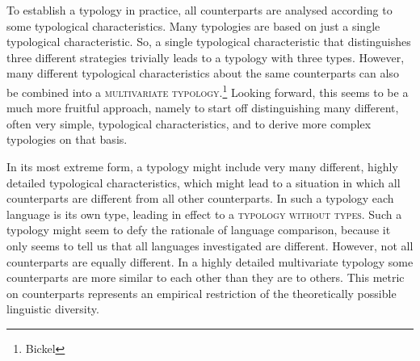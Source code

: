 %
To establish a typology in practice, all counterparts are analysed according to some  typological characteristics. Many typologies are based on just a single typological characteristic. So, a single typological characteristic that distinguishes three different strategies trivially leads to a typology with three types. However, many different typological characteristics about the same counterparts can also be combined into a \textsc{multivariate typology}.\footnote{Bickel} Looking forward, this seems to be a much more fruitful approach, namely to start off distinguishing many different, often very simple, typological characteristics, and to derive more complex typologies on that basis.

In its most extreme form, a typology might include very many different, highly detailed typological characteristics, which might lead to a situation in which all counterparts are different from all other counterparts. In such a typology each language is its own type, leading in effect to a \textsc{typology without types}. Such a typology might seem to defy the rationale of language comparison, because it only seems to tell us that all languages investigated are different. However, not all counterparts are equally different. In a highly detailed multivariate typology some counterparts are more similar to each other than they are to others. This metric on counterparts represents an empirical restriction of the theoretically possible linguistic diversity.

